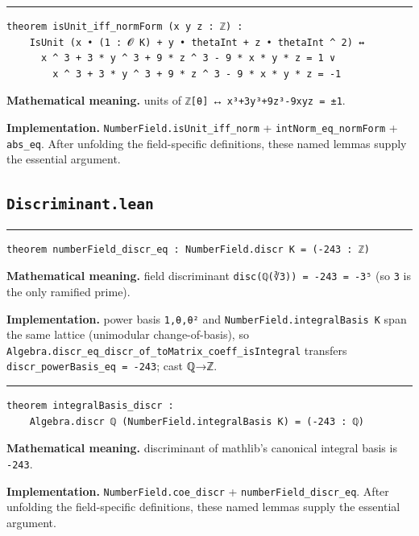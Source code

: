 \documentclass[UTF8,a4paper,11pt,fontset=fandol]{ctexart}
\theoremstyle{definition}
\newcommand{\statementsep}{\par\medskip\hrule\medskip}
\begin{document}
\statementsep
\begin{verbatim}
theorem isUnit_iff_normForm (x y z : ℤ) :
    IsUnit (x • (1 : 𝓞 K) + y • thetaInt + z • thetaInt ^ 2) ↔
      x ^ 3 + 3 * y ^ 3 + 9 * z ^ 3 - 9 * x * y * z = 1 ∨
        x ^ 3 + 3 * y ^ 3 + 9 * z ^ 3 - 9 * x * y * z = -1
\end{verbatim}
\noindent\textbf{Mathematical meaning.} units of \texttt{ℤ[θ]} ↔ \texttt{x³+3y³+9z³-9xyz = ±1}.\par
\noindent\textbf{Implementation.} \texttt{NumberField.\allowbreak{}isUnit\_\allowbreak{}iff\_\allowbreak{}norm} + \texttt{intNorm\_\allowbreak{}eq\_\allowbreak{}normForm} + \texttt{abs\_\allowbreak{}eq}. After unfolding the field-specific definitions, these named lemmas supply the essential argument.\par

\subsection{\texttt{Discriminant.lean}}

\statementsep
\begin{verbatim}
theorem numberField_discr_eq : NumberField.discr K = (-243 : ℤ)
\end{verbatim}
\noindent\textbf{Mathematical meaning.} field discriminant \texttt{disc(ℚ(∛3)) = -243 = -3⁵} (so \texttt{3} is the only ramified prime).\par
\noindent\textbf{Implementation.} power basis \texttt{1,θ,θ²} and \texttt{NumberField.\allowbreak{}integralBasis K} span the same lattice (unimodular change-of-basis), so \texttt{Algebra.\allowbreak{}discr\_\allowbreak{}eq\_\allowbreak{}discr\_\allowbreak{}of\_\allowbreak{}toMatrix\_\allowbreak{}coeff\_\allowbreak{}isIntegral} transfers \texttt{discr\_\allowbreak{}powerBasis\_\allowbreak{}eq = -243}; cast ℚ→ℤ.\par
\statementsep
\begin{verbatim}
theorem integralBasis_discr :
    Algebra.discr ℚ (NumberField.integralBasis K) = (-243 : ℚ)
\end{verbatim}
\noindent\textbf{Mathematical meaning.} discriminant of mathlib's canonical integral basis is \texttt{-243}.\par
\noindent\textbf{Implementation.} \texttt{NumberField.\allowbreak{}coe\_\allowbreak{}discr} + \texttt{numberField\_\allowbreak{}discr\_\allowbreak{}eq}. After unfolding the field-specific definitions, these named lemmas supply the essential argument.\par
\end{document}
